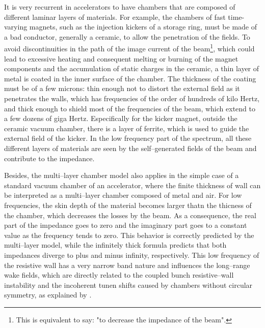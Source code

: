     It is very recurrent in accelerators to have chambers that are composed of different laminar layers of materials. For example, the chambers of fast time-varying magnets, such as the injection kickers of a storage ring, must be made of a bad conductor, generally a ceramic, to allow the penetration of the fields. To avoid discontinuities in the path of the image current of the beam\footnote{This is equivalent to say: "to decrease the impedance of the beam".}, which could lead to excessive heating and consequent melting or burning of the magnet components and the accumulation of static charges in the ceramic, a thin layer of metal is coated in the inner surface of the chamber. The thickness of the coating must be of a few microns: thin enough not to distort the external field as it penetrates the walls, which has frequencies of the order of hundreds of kilo Hertz, and thick enough to shield most of the frequencies of the beam, which extend to a few dozens of giga Hertz. Especifically for the kicker magnet, outside the ceramic vacuum chamber, there is a layer of ferrite, which is used to guide the external field of the kicker. In the low frequency part of the spectrum, all these different layers of materials are seen by the self--generated fields of the beam and contribute to the impedance.

    Besides, the multi--layer chamber model also applies in the simple case of a standard vacuum chamber of an accelerator, where the finite thickness of wall can be interpreted as a multi--layer chamber composed of metal and air. For low frequencies, the skin depth of the material becomes larger thatn the thicness of the chamber, which decreases the losses by the beam. As a consequence, the real part of the impedance goes to zero and the imaginary part goes to a constant value as the frequency tends to zero. This behavior is correctly predicted by the multi--layer model, while the infinitely thick formula predicts that both impedances diverge to plus and minus infinity, respectively. This low frequency of the resistive wall has a very narrow band nature and influences the long--range wake fields, which are directly related to the coupled bunch resistive--wall instability and the incoherent tunen shifts caused by chambers without circular symmetry, as explained by .

